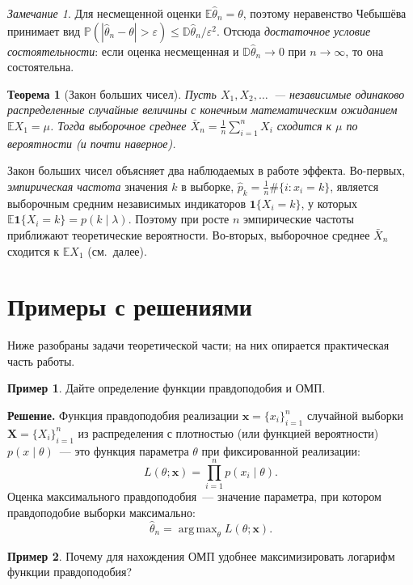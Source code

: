\documentclass[a4paper,12pt]{article}
\theoremstyle{definition}
\newtheorem{example}{Пример}
\theoremstyle{plain}
\newtheorem{theorem}{Теорема}
\theoremstyle{remark}
\newtheorem*{remark}{Замечание}
\DeclareMathOperator*{\argmax}{arg\,max}
\newcommand{\E}{\mathbb{E}}
\newcommand{\D}{\mathbb{D}}
\renewcommand{\P}{\mathbb{P}}
\begin{document}
\begin{remark}
Для несмещенной оценки $\E\hat\theta_n=\theta$, поэтому неравенство Чебышёва принимает вид $\P(|\hat\theta_n-\theta|>\varepsilon)\le \D\hat\theta_n/\varepsilon^2$. Отсюда \emph{достаточное условие состоятельности}: если оценка несмещенная и $\D\hat\theta_n\to0$ при $n\to\infty$, то она состоятельна.
\end{remark}

\begin{theorem}[Закон больших чисел]
Пусть $X_1,X_2,\dots$~--- независимые одинаково распределенные случайные величины с конечным математическим ожиданием $\E X_1=\mu$. Тогда выборочное среднее $\bar X_n=\frac1n\sum_{i=1}^n X_i$ сходится к $\mu$ по вероятности (и почти наверное).
\end{theorem}

Закон больших чисел объясняет два наблюдаемых в работе эффекта. Во-первых, \emph{эмпирическая частота} значения $k$ в выборке, $\hat p_k=\frac1n\#\{i:x_i=k\}$, является выборочным средним независимых индикаторов $\mathbf 1\{X_i=k\}$, у которых $\E\mathbf 1\{X_i=k\}=p(k\mid\lambda)$. Поэтому при росте $n$ эмпирические частоты приближают теоретические вероятности. Во-вторых, выборочное среднее $\bar X_n$ сходится к $\E X_1$ (см.\ далее).

\section{Примеры с решениями}

Ниже разобраны задачи теоретической части; на них опирается практическая часть работы.

\begin{example}
Дайте определение функции правдоподобия и ОМП.
\end{example}

\noindent\textbf{Решение.} Функция правдоподобия реализации $\mathbf{x}=\{x_i\}_{i=1}^n$ случайной выборки $\mathbf{X}=\{X_i\}_{i=1}^n$ из распределения с плотностью (или функцией вероятности) $p(x\mid\theta)$~--- это функция параметра $\theta$ при фиксированной реализации:
$$L(\theta;\mathbf{x})=\prod_{i=1}^n p(x_i\mid\theta).$$
Оценка максимального правдоподобия~--- значение параметра, при котором правдоподобие выборки максимально:
$$\hat\theta_n=\argmax_{\theta}L(\theta;\mathbf{x}).$$

\begin{example}
Почему для нахождения ОМП удобнее максимизировать логарифм функции правдоподобия?
\end{example}
\end{document}
